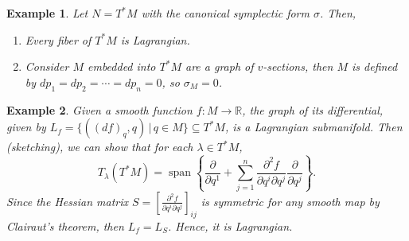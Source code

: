 \documentclass{article}
\newcommand{\R}{\mathbb R}
\newcommand{\pd}[1]{\frac{\partial}{\partial #1}}
\DeclareMathOperator{\spn}{span}
\newtheorem{ex}{Example}
\begin{document}
\begin{ex}
    Let $N=T^*M$ with the canonical symplectic form $\sigma$. Then,
    \begin{enumerate}
        \item Every fiber of $T^*M$ is Lagrangian.
        \item Consider $M$ embedded into $T^*M$ are a graph of $v$-sections, then $M$ is defined by $dp_1 = dp_2 = \cdots = dp_n = 0$, so $\sigma_M = 0$.
    \end{enumerate}
\end{ex}
\begin{ex}
    Given a smooth function $f:M\to \R$, the graph of its differential, given by $L_f = \{((df)_q,q)\,|\, q\in M\}\subseteq T^*M$, is a Lagrangian submanifold. Then (sketching), we can show that for each $\lambda\in T^*M$,
    \[T_\lambda(T^*M) = \spn\left\{\pd{q^1} + \sum_{j=1}^n \frac{\partial^2 f}{\partial q^i\partial q^j }\pd{q^j}\right\}.\]
    Since the Hessian matrix $S=\left[\frac{\partial^2 f}{\partial q^i\partial q^j }\right]_{ij}$ is symmetric for any smooth map by Clairaut's theorem, then $L_f = L_S$. Hence, it is Lagrangian.
\end{ex}
\end{document}
